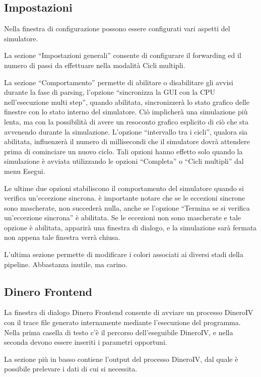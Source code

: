 \documentclass[letterpaper,10pt,english]{sphinxmanual}
\begin{document}
\subsection{Impostazioni}
\label{user-interface:impostazioni}
Nella finestra di configurazione possono essere configurati vari aspetti del
simulatore.

La sezione ``Impostazioni generali'' consente di configurare il forwarding ed il
numero di passi da effettuare nella modalità Cicli multipli.

La sezione ``Comportamento'' permette di abilitare o disabilitare gli avvisi
durante la fase di parsing, l'opzione ``sincronizza la GUI con la CPU
nell'esecuzione multi step'', quando abilitata, sincronizzerà lo stato
grafico delle finestre con lo stato interno del simulatore. Ciò
implicherà una simulazione più lenta, ma con la possibilità di
avere un resoconto grafico esplicito di ciò che sta avvenendo durante la
simulazione.  L'opzione ``intervallo tra i cicli'', qualora sia abilitata,
influenzerà il numero di millisecondi che il simulatore dovrà
attendere prima di cominciare un nuovo ciclo. Tali opzioni hanno effetto solo
quando la simulazione è avviata utilizzando le opzioni ``Completa'' o ``Cicli
multipli'' dal menu Esegui.

Le ultime due opzioni stabiliscono il comportamento del simulatore quando si
verifica un'eccezione sincrona.  è importante notare che se le eccezioni
sincrone sono mascherate, non succederà nulla, anche se l'opzione ``Termina
se si verifica un'eccezione sincrona'' è abilitata. Se le eccezioni non
sono mascherate e tale opzione è abilitata, apparirà una finestra di
dialogo, e la simulazione sarà fermata non appena tale finestra verrà
chiusa.

L'ultima sezione permette di modificare i colori associati ai diversi stadi
della pipeline. Abbastanza inutile, ma carino.


\subsection{Dinero Frontend}
\label{user-interface:dinero-frontend}
La finestra di dialogo Dinero Frontend consente di avviare un processo
DineroIV con il trace file generato internamente mediante l'esecuzione del
programma. Nella prima casella di testo c'è il percorso dell'eseguibile
DineroIV, e nella seconda devono essere inseriti i parametri opportuni.

La sezione più in basso contiene l'output del processo DineroIV, dal quale
è possibile prelevare i dati di cui si necessita.
\end{document}

